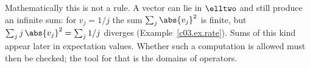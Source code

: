 \begin{fundament}
  Mathematically this is not a rule. A vector can lie in $\elltwo$ and still produce an
  infinite sum: for $v_j = 1/j$ the sum $\sum_j \abs{v_j}^2$ is finite, but
  $\sum_j j\, \abs{v_j}^2 = \sum_j 1/j$ diverges (Example~\ref{c03.ex.rate}). Sums of this
  kind appear later in expectation values. Whether such a computation is allowed must then be
  checked; the tool for that is the domains of operators.
\end{fundament}
